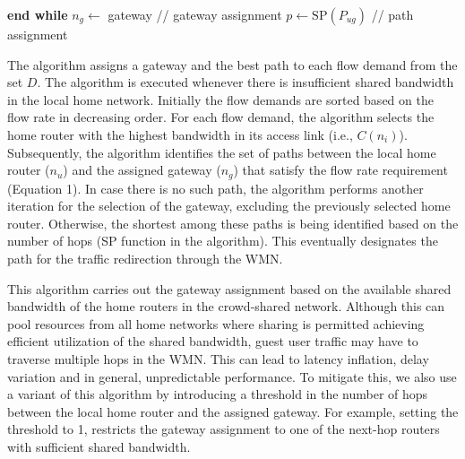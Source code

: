 \begin{algorithm}[htbp]
\begin{algorithmic}
    \STATE \hspace{0.4cm} \textbf{end while}
    \vspace{0.7mm}
    \STATE \hspace{0.4cm} $n_g \leftarrow$ gateway \hspace{0.2cm} // gateway assignment
    \vspace{0.7mm}
    \STATE \hspace{0.4cm} $p \leftarrow \mathrm{SP} (P_{ug})$ \hspace{0.3cm} // path assignment
    \vspace{0.7mm}
    \ENDFOR
  \end{algorithmic}
\end{algorithm}

The algorithm assigns a gateway and the best path to each flow demand from the set $D$. The algorithm is executed whenever there is insufficient shared bandwidth in the local home network. Initially the flow demands are sorted based on the flow rate in decreasing order. For each flow demand, the algorithm selects the home router with the highest bandwidth in its access link (i.e., $C(n_i)$). Subsequently, the algorithm identifies the set of paths between the local home router ($n_u$) and the assigned gateway ($n_g$) that satisfy the flow rate requirement (Equation 1). In case there is no such path, the algorithm performs another iteration for the selection of the gateway, excluding the previously selected home router. Otherwise, the shortest among these paths is being identified based on the number of hops (SP function in the algorithm). This eventually designates the path for the traffic redirection through the WMN.

This algorithm carries out the gateway assignment based on the available shared bandwidth of the home routers in the crowd-shared network. Although this can pool resources from all home networks where sharing is permitted achieving efficient utilization of the shared bandwidth, guest user traffic may have to traverse multiple hops in the WMN. This can lead to latency inflation, delay variation and in general, unpredictable performance. To mitigate this, we also use a variant of this algorithm by introducing a threshold in the number of hops between the local home router and the assigned gateway. For example, setting the threshold to 1, restricts the gateway assignment to one of the next-hop routers with sufficient shared bandwidth.


